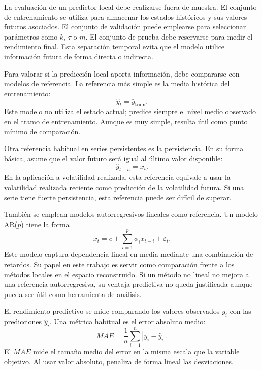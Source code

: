 La evaluación de un predictor local debe realizarse fuera de muestra. El conjunto de entrenamiento se utiliza para almacenar los estados históricos y sus valores futuros asociados. El conjunto de validación puede emplearse para seleccionar parámetros como \(k\), \(\tau\) o \(m\). El conjunto de prueba debe reservarse para medir el rendimiento final. Esta separación temporal evita que el modelo utilice información futura de forma directa o indirecta.

Para valorar si la predicción local aporta información, debe compararse con modelos de referencia. La referencia más simple es la media histórica del entrenamiento:
\begin{equation}
    \hat{y}_t=\bar{y}_{\mathrm{train}}.
\end{equation}
Este modelo no utiliza el estado actual; predice siempre el nivel medio observado en el tramo de entrenamiento. Aunque es muy simple, resulta útil como punto mínimo de comparación.

Otra referencia habitual en series persistentes es la persistencia. En su forma básica, asume que el valor futuro será igual al último valor disponible:
\begin{equation}
    \hat{y}_{t+h}=x_t.
\end{equation}
En la aplicación a volatilidad realizada, esta referencia equivale a usar la volatilidad realizada reciente como predicción de la volatilidad futura. Si una serie tiene fuerte persistencia, esta referencia puede ser difícil de superar.

También se emplean modelos autorregresivos lineales como referencia. Un modelo AR(\(p\)) tiene la forma
\begin{equation}
    x_t=c+\sum_{i=1}^{p}\phi_i x_{t-i}+\varepsilon_t.
\end{equation}
Este modelo captura dependencia lineal en media mediante una combinación de retardos. Su papel en este trabajo es servir como comparación frente a los métodos locales en el espacio reconstruido. Si un método no lineal no mejora a una referencia autorregresiva, su ventaja predictiva no queda justificada aunque pueda ser útil como herramienta de análisis.

El rendimiento predictivo se mide comparando los valores observados \(y_i\) con las predicciones \(\hat{y}_i\). Una métrica habitual es el error absoluto medio:
\begin{equation}
    MAE=\frac{1}{n}\sum_{i=1}^{n}|y_i-\hat{y}_i|.
\end{equation}
El \(MAE\) mide el tamaño medio del error en la misma escala que la variable objetivo. Al usar valor absoluto, penaliza de forma lineal las desviaciones.

